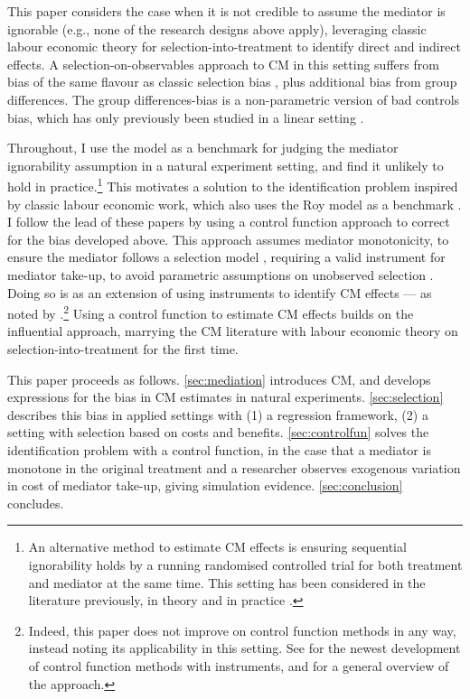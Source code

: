 This paper considers the case when it is not credible to assume the mediator is ignorable (e.g., none of the research designs above apply), leveraging classic labour economic theory for selection-into-treatment to identify direct and indirect effects.
A selection-on-observables approach to CM in this setting suffers from bias of the same flavour as classic selection bias \citep{heckman1998characterizing}, plus additional bias from group differences.
The group differences-bias is a non-parametric version of bad controls bias, which has only previously been studied in a linear setting \citep{cinelli2024crash,ding2015adjust}.

Throughout, I use the \cite{roy1951some} model as a benchmark for judging the \cite{imai2010identification} mediator ignorability assumption in a natural experiment setting, and find it unlikely to hold in practice.\footnote{
    An alternative method to estimate CM effects is ensuring sequential ignorability holds by a running randomised controlled trial for both treatment and mediator at the same time.
    This setting has been considered in the literature previously, in theory \citep{imai2013experimental} and in practice \citep{ludwig2011mechanism}.
}
This motivates a solution to the identification problem inspired by classic labour economic work, which also uses the Roy model as a benchmark \citep{heckman1979sample,heckman1990empirical}.
I follow the lead of these papers by using a control function approach to correct for the bias developed above.
This approach assumes mediator monotonicity, to ensure the mediator follows a selection model \citep{vytlacil2002independence}, requiring a valid instrument for mediator take-up, to avoid parametric assumptions on unobserved selection \citep{heckman2004using,florens2008identification}.
Doing so is as an extension of using instruments to identify CM effects --- as noted by \cite{frolich2017direct}.\footnote{
    Indeed, this paper does not improve on control function methods in any way, instead noting its applicability in this setting.
    See \cite{frolich2017direct} for the newest development of control function methods with instruments, and \cite{imbens2007nonadditive} for a general overview of the approach.
}
Using a control function to estimate CM effects builds on the influential \cite{imai2010identification} approach, marrying the CM literature with labour economic theory on selection-into-treatment for the first time. 

This paper proceeds as follows.
\autoref{sec:mediation} introduces CM, and develops expressions for the bias in CM estimates in natural experiments.
\autoref{sec:selection} describes this bias in applied settings with (1) a regression framework, (2) a setting with selection based on costs and benefits.
\autoref{sec:controlfun} solves the identification problem with a control function, in the case that a mediator is monotone in the original treatment and a researcher observes exogenous variation in cost of mediator take-up, giving simulation evidence.
\autoref{sec:conclusion} concludes.
